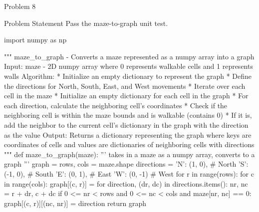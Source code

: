 \begin{problem}{Problem 8}
    \begin{statement}{Problem Statement}
        Pass the maze-to-graph unit test.
    \end{statement}

    \begin{highlight}[Solution]
    \begin{code}[Python]
    import numpy as np

    """ maze_to_graph - Converts a maze represented as a numpy array into a graph
        Input:
            maze - 2D numpy array where 0 represents walkable cells and 1 represents walls
        Algorithm:
            * Initialize an empty dictionary to represent the graph
            * Define the directions for North, South, East, and West movements
            * Iterate over each cell in the maze
                * Initialize an empty dictionary for each cell in the graph
                * For each direction, calculate the neighboring cell's coordinates
                * Check if the neighboring cell is within the maze bounds and is walkable (contains 0)
                    * If it is, add the neighbor to the current cell's dictionary in the graph with the direction as the value
        Output:
            Returns a dictionary representing the graph where keys are coordinates of cells and values are dictionaries
            of neighboring cells with directions
    """
    def maze_to_graph(maze):
        ''' takes in a maze as a numpy array, converts to a graph '''
        graph = {}
        rows, cols = maze.shape
        directions = {
            'N': (1, 0),  # North
            'S': (-1, 0),   # South
            'E': (0, 1),   # East
            'W': (0, -1)   # West
        }
        for r in range(rows):
            for c in range(cols):
                graph[(c, r)] = {}
                for direction, (dr, dc) in directions.items():
                    nr, nc = r + dr, c + dc
                    if 0 <= nr < rows and 0 <= nc < cols and maze[nr, nc] == 0:
                        graph[(c, r)][(nc, nr)] = direction
        return graph
    \end{code}
    \end{highlight}
\end{problem}

